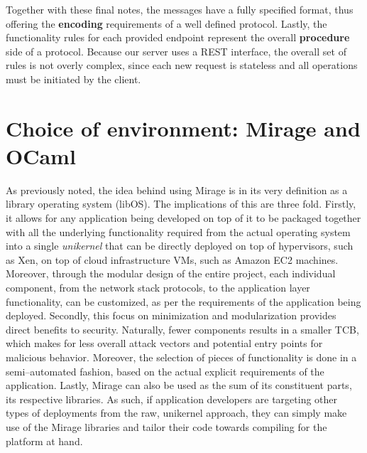 Together with these final notes, the messages have a fully specified format, thus offering the \textbf{encoding} requirements of a well defined protocol.
Lastly, the functionality rules for each provided endpoint represent the overall \textbf{procedure} side of a protocol.
Because our server uses a REST interface, the overall set of rules is not overly complex, since each new request is stateless and all operations must be initiated by the client.

\section{Choice of environment: Mirage and OCaml}
As previously noted, the idea behind using Mirage is in its very definition as a library operating system (libOS).
The implications of this are three fold.
Firstly, it allows for any application being developed on top of it to be packaged together with all the underlying functionality required from the actual operating system into a single \textit{unikernel} that can be directly deployed on top of hypervisors, such as Xen, on top of cloud infrastructure VMs, such as Amazon EC2 machines.
Moreover, through the modular design of the entire project, each individual component, from the network stack protocols, to the application layer functionality, can be customized, as per the requirements of the application being deployed.
Secondly, this focus on minimization and modularization provides direct benefits to security.
Naturally, fewer components results in a smaller TCB, which makes for less overall attack vectors and potential entry points for malicious behavior.
Moreover, the selection of pieces of functionality is done in a semi--automated fashion, based on the actual explicit requirements of the application.
Lastly, Mirage can also be used as the sum of its constituent parts, its respective libraries.
As such, if application developers are targeting other types of deployments from the raw, unikernel approach, they can simply make use of the Mirage libraries and tailor their code towards compiling for the platform at hand.


